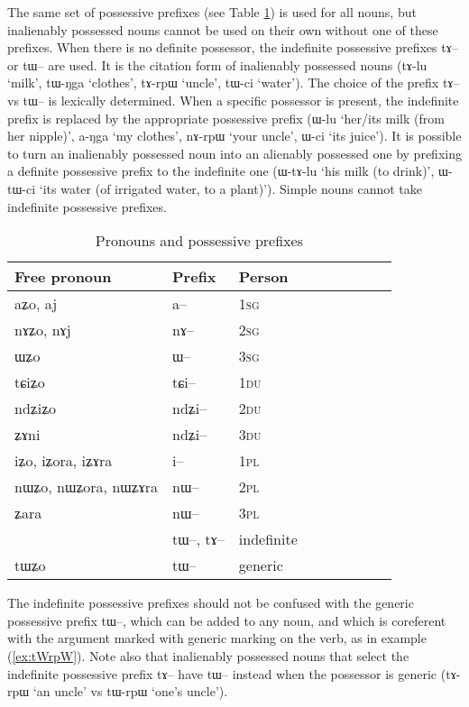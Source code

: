 \documentclass[oldfontcommands,oneside,a4paper,11pt]{article}
\newcommand{\ipa}[1]{{\phon#1}} %
\newcommand{\refb}[1]{(\ref{#1})}
\begin{document}
The same set of possessive prefixes (see Table \ref{tab:pronoun}) is used for all nouns, but inalienably possessed nouns cannot be used on their own without one of these prefixes. When there is no definite possessor, the indefinite possessive prefixes \ipa{tɤ--} or \ipa{tɯ--} are used. It is the citation form of inalienably possessed nouns (\ipa{tɤ-lu} `milk', \ipa{tɯ-ŋga} `clothes', \ipa{tɤ-rpɯ} `uncle', \ipa{tɯ-ci} `water'). The choice of the prefix \ipa{tɤ--} vs \ipa{tɯ--} is lexically determined.  When a specific possessor is present, the indefinite prefix is replaced by the appropriate possessive prefix (\ipa{ɯ-lu} `her/its milk (from her nipple)', \ipa{a-ŋga} `my clothes', \ipa{nɤ-rpɯ} `your uncle', \ipa{ɯ-ci} `its juice'). It is possible to turn an inalienably possessed noun into an alienably possessed one by prefixing a definite possessive prefix to the indefinite one (\ipa{ɯ-tɤ-lu} `his milk (to drink)', \ipa{ɯ-tɯ-ci} `its water (of irrigated water, to a plant)'). Simple nouns cannot take indefinite possessive prefixes.


\begin{table}[H] \centering
\caption{Pronouns and possessive prefixes }\label{tab:pronoun}
\begin{tabular}{lllllllll} 
\toprule
 Free pronoun & Prefix & Person\\
\midrule
 \ipa{aʑo},    \ipa{aj} &	\ipa{a--}  &		1\textsc{sg} \\
\ipa{nɤʑo},  \ipa{nɤj} &	\ipa{nɤ--}  &			2\textsc{sg}\\
\ipa{ɯʑo}  &	\ipa{ɯ--}  &			3\textsc{sg}\\
\midrule
\ipa{tɕiʑo}  &	\ipa{tɕi--}  &			1\textsc{du} \\
\ipa{ndʑiʑo}  &	\ipa{ndʑi--}  &		2\textsc{du} \\	
\ipa{ʑɤni}  &	\ipa{ndʑi--}  &		3\textsc{du} \\	
\midrule
\ipa{iʑo}, \ipa{iʑora},   \ipa{iʑɤra}   &	\ipa{i--}  &			1\textsc{pl} \\
\ipa{nɯʑo}, \ipa{nɯʑora},   \ipa{nɯʑɤra}  &	\ipa{nɯ--}  &			2\textsc{pl} \\
\ipa{ʑara}  &	\ipa{nɯ--}  &			3\textsc{pl} \\
\midrule
&  \ipa{tɯ--},  \ipa{tɤ--} & indefinite \\
\ipa{tɯʑo} & \ipa{tɯ--}   &  generic\\
\bottomrule
\end{tabular}
\end{table}

The indefinite possessive prefixes should not be confused with the generic possessive prefix \ipa{tɯ--}, which can be added to any noun, and which is coreferent with the argument marked with generic marking on the verb, as in example \refb{ex:tWrpW}. Note also that inalienably possessed nouns that select the indefinite possessive prefix \ipa{tɤ--} have \ipa{tɯ--} instead when the possessor is generic (\ipa{tɤ-rpɯ} `an uncle' vs \ipa{tɯ-rpɯ} `one's uncle').
\end{document}

